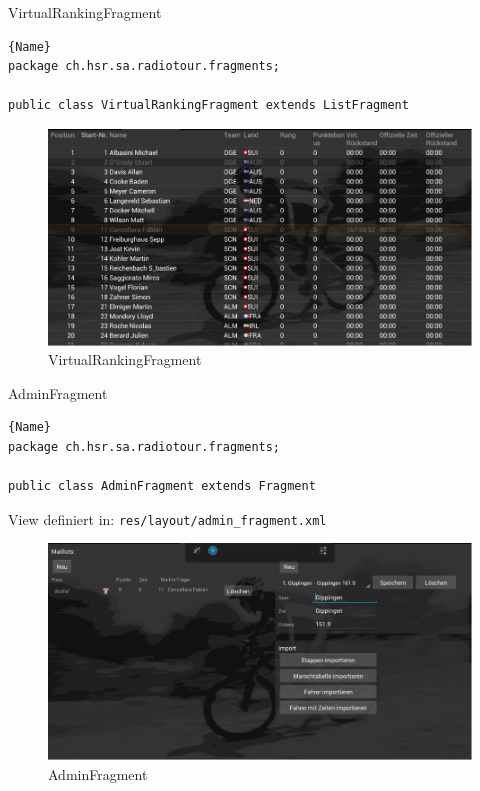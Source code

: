 VirtualRankingFragment
\begin{lstlisting}{Name}
package ch.hsr.sa.radiotour.fragments;

public class VirtualRankingFragment extends ListFragment
\end{lstlisting}


\begin{figure}[h!]
\caption{VirtualRankingFragment}
\centering
\includegraphics[scale=0.9]{07anhang/images/dev_virtual.png}
\end{figure}

AdminFragment
\begin{lstlisting}{Name}
package ch.hsr.sa.radiotour.fragments;

public class AdminFragment extends Fragment
\end{lstlisting}


View definiert in:
\lstinline|res/layout/admin_fragment.xml|
 
\begin{figure}[h!]
\caption{AdminFragment}
\centering
\includegraphics[scale=0.9]{07anhang/images/dev_adminfragment.png}
\end{figure}


